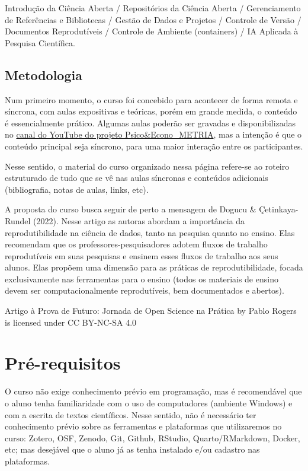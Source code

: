 \documentclass[
  a4paper,
]{article}
\begin{document}

Introdução da Ciência Aberta / Repositórios da Ciência Aberta /
Gerenciamento de Referências e Bibliotecas / Gestão de Dados e Projetos
/ Controle de Versão / Documentos Reprodutíveis / Controle de Ambiente
(containers) / IA Aplicada à Pesquisa Científica.

\subsection*{Metodologia}\label{sec-method}


Num primeiro momento, o curso foi concebido para acontecer de forma
remota e síncrona, com aulas expositivas e teóricas, porém em grande
medida, o conteúdo é essencialmente prático. Algumas aulas poderão ser
gravadas e disponibilizadas no
\href{https://www.youtube.com/c/PsicoEconoMETRIA}{canal do YouTube do
projeto Psico\&Econo\_METRIA}, mas a intenção é que o conteúdo principal
seja síncrono, para uma maior interação entre os participantes.

Nesse sentido, o material do curso organizado nessa página refere-se ao
roteiro estruturado de tudo que se vê nas aulas síncronas e conteúdos
adicionais (bibliografia, notas de aulas, links, etc).

A proposta do curso busca seguir de perto a mensagem de Dogucu \&
Çetinkaya-Rundel (2022). Nesse artigo as autoras abordam a importância
da reprodutibilidade na ciência de dados, tanto na pesquisa quanto no
ensino. Elas recomendam que os professores-pesquisadores adotem fluxos
de trabalho reprodutíveis em suas pesquisas e ensinem esses fluxos de
trabalho aos seus alunos. Elas propõem uma dimensão para as práticas de
reprodutibilidade, focada exclusivamente nas ferramentas para o ensino
(todos os materiais de ensino devem ser computacionalmente
reprodutíveis, bem documentados e abertos).

Artigo à Prova de Futuro: Jornada de Open Science na Prática by Pablo
Rogers is licensed under CC BY-NC-SA 4.0


\section*{Pré-requisitos 📇}\label{sec-prework}


O curso não exige conhecimento prévio em programação, mas é recomendável
que o aluno tenha familiaridade com o uso de computadores (ambiente
Windows) e com a escrita de textos científicos. Nesse sentido, não é
necessário ter conhecimento prévio sobre as ferramentas e plataformas
que utilizaremos no curso: Zotero, OSF, Zenodo, Git, Github, RStudio,
Quarto/RMarkdown, Docker, etc; mas desejável que o aluno já as tenha
instalado e/ou cadastro nas plataformas.
\end{document}
